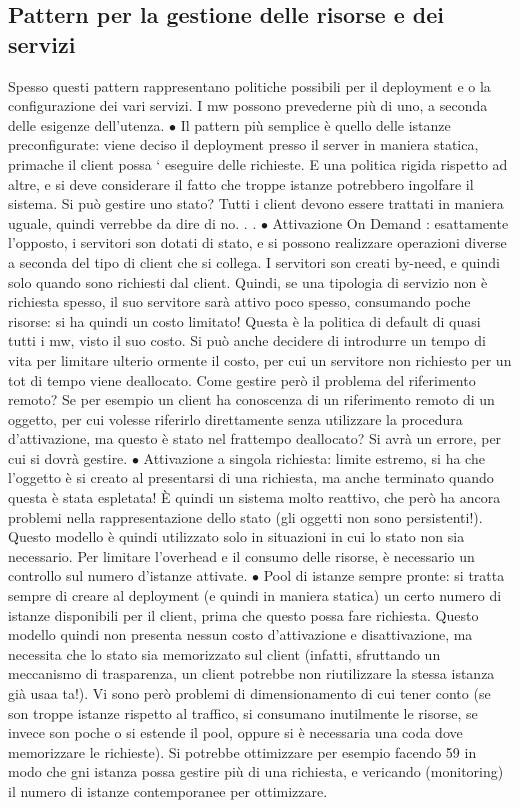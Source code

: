 \subsection{Pattern per la gestione delle risorse e dei servizi}
Spesso questi pattern rappresentano politiche possibili per il deployment e o la
configurazione dei vari servizi. I mw possono prevederne più di uno, a seconda
delle esigenze dell'utenza.
$\bullet$ Il pattern più semplice è quello delle istanze preconfigurate: viene deciso
il deployment presso il server in maniera statica, primache il client possa
`
eseguire delle richieste. E una politica rigida rispetto ad altre, e si deve
considerare il fatto che troppe istanze potrebbero ingolfare il sistema. Si
può gestire uno stato? Tutti i client devono essere trattati in maniera
uguale, quindi verrebbe da dire di no. . .
$\bullet$ Attivazione On Demand : esattamente l'opposto, i servitori son dotati di
stato, e si possono realizzare operazioni diverse a seconda del tipo di client
che si collega. I servitori son creati by-need, e quindi solo quando sono
richiesti dal client. Quindi, se una tipologia di servizio non è richiesta
spesso, il suo servitore sarà attivo poco spesso, consumando poche risorse:
si ha quindi un costo limitato! Questa è la politica di default di quasi tutti
i mw, visto il suo costo.
Si può anche decidere di introdurre un tempo di vita per limitare ulterio
ormente il costo, per cui un servitore non richiesto per un tot di tempo
viene deallocato.
Come gestire però il problema del riferimento remoto? Se per esempio
un client ha conoscenza di un riferimento remoto di un oggetto, per cui
volesse riferirlo direttamente senza utilizzare la procedura d'attivazione,
ma questo è stato nel frattempo deallocato? Si avrà un errore, per cui si
dovrà gestire.
$\bullet$ Attivazione a singola richiesta: limite estremo, si ha che l'oggetto è si
creato al presentarsi di una richiesta, ma anche terminato quando questa è stata espletata! È quindi un sistema molto
reattivo, che però ha ancora problemi nella rappresentazione dello stato (gli oggetti non sono persistenti!). Questo
modello è quindi utilizzato solo in situazioni in cui lo stato non sia necessario. Per limitare l'overhead e il consumo
delle risorse, è necessario un controllo sul numero d'istanze attivate.
$\bullet$ Pool di istanze sempre pronte: si tratta sempre di creare al deployment
(e quindi in maniera statica) un certo numero di istanze disponibili per
il client, prima che questo possa fare richiesta. Questo modello quindi
non presenta nessun costo d'attivazione e disattivazione, ma necessita che
lo stato sia memorizzato sul client (infatti, sfruttando un meccanismo di
trasparenza, un client potrebbe non riutilizzare la stessa istanza già usaa
ta!). Vi sono però problemi di dimensionamento di cui tener conto (se son
troppe istanze rispetto al traffico, si consumano inutilmente le risorse, se
invece son poche o si estende il pool, oppure si è necessaria una coda dove
memorizzare le richieste). Si potrebbe ottimizzare per esempio facendo
59
in modo che gni istanza possa gestire più di una richiesta, e vericando
(monitoring) il numero di istanze contemporanee per ottimizzare.


